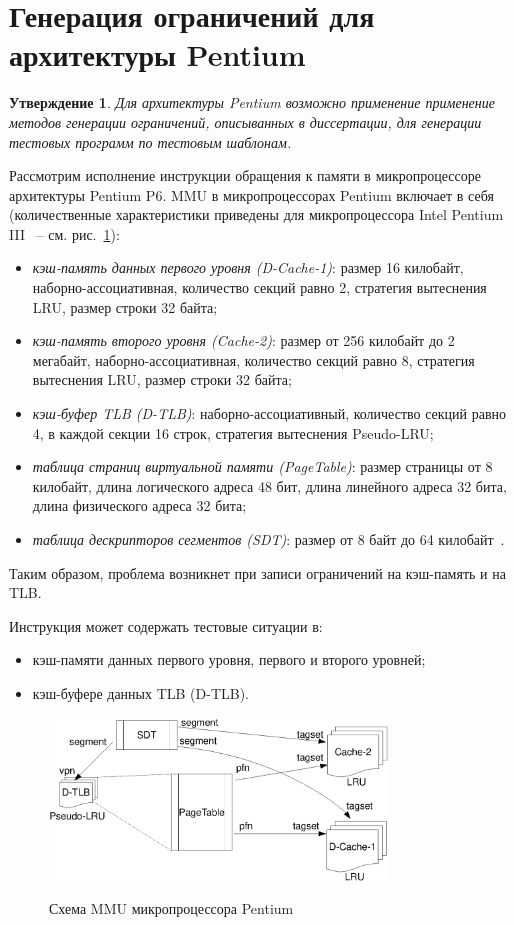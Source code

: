 \documentclass[14pt]{extreport}
\newtheorem{utv}{Утверждение}
\newcommand{\LRU}{\textsf{LRU}\xspace}
\newcommand{\PseudoLRU}{\textsf{Pseudo-LRU}\xspace}
\begin{document}
\section{Генерация ограничений для архитектуры Pentium}

\begin{utv}
Для архитектуры Pentium возможно применение применение методов
генерации ограничений, описыванных в диссертации, для генерации
тестовых программ по тестовым шаблонам.
\end{utv}

Рассмотрим исполнение инструкции обращения к памяти в
микропроцессоре архитектуры Pentium P6. MMU в микропроцессорах
Pentium включает в себя (количественные характеристики приведены для
микропроцессора Intel Pentium III~\cite{HennessyPatterson3rd} -- см.
рис.~\ref{p6_mmu_scheme}):
\begin{itemize}
  \item \emph{кэш-память данных первого уровня (D-Cache-1)}: размер
  16 килобайт, наборно-ассоциативная, количество секций равно 2,
  стратегия вытеснения \LRU, размер строки 32 байта;
  \item \emph{кэш-память второго уровня (Cache-2)}: размер от 256 килобайт
  до 2 мегабайт, наборно-ассоциативная, количество секций равно 8, стратегия
  вытеснения \LRU, размер строки 32 байта;
  \item \emph{кэш-буфер TLB (D-TLB)}: наборно-ассоциативный,
  количество секций равно 4, в каждой секции 16 строк, стратегия вытеснения
  \PseudoLRU;
  \item \emph{таблица страниц виртуальной памяти (PageTable)}:
  размер страницы от 8 килобайт, длина логического адреса 48 бит,
  длина линейного адреса 32 бита, длина физического адреса 32 бита;
  \item \emph{таблица дескрипторов сегментов (SDT)}: размер от 8 байт до 64
  килобайт~\cite{FundamentalOfComputerOrganizationAndDesign}.
\end{itemize}
Таким образом, проблема возникнет при записи ограничений на
кэш-память и на TLB.

Инструкция может содержать тестовые ситуации в:
\begin{itemize}
  \item кэш-памяти данных первого уровня, первого и второго уровней;
  \item кэш-буфере данных TLB (D-TLB).
\end{itemize}

\begin{figure}[h] \center
  \includegraphics[width=0.8\textwidth]{4.analysis/p6}\\
  \caption{Схема MMU микропроцессора Pentium}\label{p6_mmu_scheme}
\end{figure}
\end{document}

